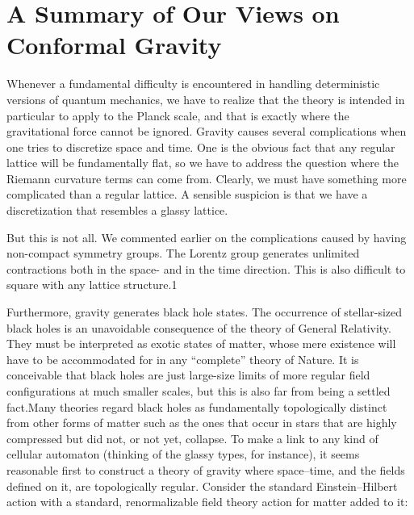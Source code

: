 \documentclass[main.tex]{subfiles}
\begin{document}
\section{A Summary of Our Views on Conformal Gravity}

Whenever a fundamental difficulty is encountered in handling deterministic versions of quantum mechanics, we have to realize that the theory is intended in particular to apply to the Planck scale, and that is exactly where the gravitational force cannot be ignored. Gravity causes several complications when one tries to discretize space and time. One is the obvious fact that any regular lattice will be fundamentally flat, so we have to address the question where the Riemann curvature terms can come from. Clearly, we must have something more complicated than a regular lattice. A sensible suspicion is that we have a discretization that resembles a glassy lattice.

But this is not all. We commented earlier on the complications caused by having non-compact symmetry groups. The Lorentz group generates unlimited contractions both in the space- and in the time direction. This is also difficult to square with any lattice structure.1

Furthermore, gravity generates black hole states. The occurrence of stellar-sized black holes is an unavoidable consequence of the theory of General Relativity. They must be interpreted as exotic states of matter, whose mere existence will have to be accommodated for in any “complete” theory of Nature. It is conceivable that black holes are just large-size limits of more regular field configurations at much smaller scales, but this is also far from being a settled fact.Many theories regard black holes as fundamentally topologically distinct from other forms of matter such as the ones that occur in stars that are highly compressed but did not, or not yet, collapse. To make a link to any kind of cellular automaton (thinking of the glassy types, for instance), it seems reasonable first to construct a theory of gravity where space–time, and the fields defined on it, are topologically regular. Consider the standard Einstein–Hilbert action with a standard, renormalizable field theory action for matter added to it:
\end{document}
